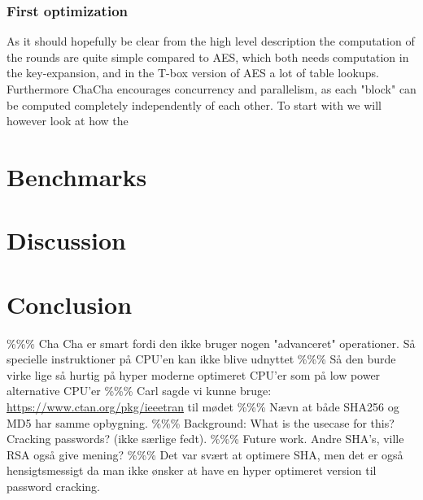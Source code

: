 \documentclass[a4paper]{article}
\begin{document}
\subsubsection{First optimization}
\label{sec:org3531a1b}
As it should hopefully be clear from the high level description the computation of the rounds are quite simple compared to AES, which both needs computation in the key-expansion, and in the T-box version of AES a lot of table lookups. Furthermore ChaCha encourages concurrency and parallelism, as each "block" can be computed completely independently of each other. To start with we will however look at how the

\section{Benchmarks}
\label{sec:org7603f3d}

\section{Discussion}
\label{sec:org3c6f4d9}

\section{Conclusion}
\label{sec:org1072d81}




\begin{appendix}

\end{appendix}
\%\%\% Cha Cha er smart fordi den ikke bruger nogen "advanceret" operationer. Så specielle instruktioner på CPU'en kan ikke blive udnyttet
\%\%\% Så den burde virke lige så hurtig på hyper moderne optimeret CPU'er som på low power alternative CPU'er
\%\%\% Carl sagde vi kunne bruge: \url{https://www.ctan.org/pkg/ieeetran} til mødet
\%\%\% Nævn at både SHA256 og MD5 har samme opbygning.
\%\%\% Background: What is the usecase for this? Cracking passwords? (ikke særlige fedt).
\%\%\% Future work. Andre SHA's, ville RSA også give mening?
\%\%\% Det var svært at optimere SHA, men det er også hensigtsmessigt da man ikke ønsker at have en hyper optimeret version til password cracking.
\end{document}
